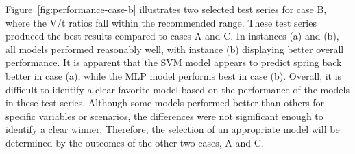 Figure~\ref{fig:performance-case-b} illustrates two selected test series for case B, where the V/t ratios fall within
the recommended range.
These test series produced the best results compared to cases A and C.
In instances (a) and (b), all models performed reasonably well, with instance (b) displaying better overall
performance.
It is apparent that the SVM model appears to predict spring back better in case (a), while the MLP model performs
best in case (b).
Overall, it is difficult to identify a clear favorite model based on the performance of the models in these test
series. Although some models performed better than others for specific variables or scenarios, the differences were
not significant enough to identify a clear winner. Therefore, the selection of an appropriate model will be
determined by the outcomes of the other two cases, A and C.

